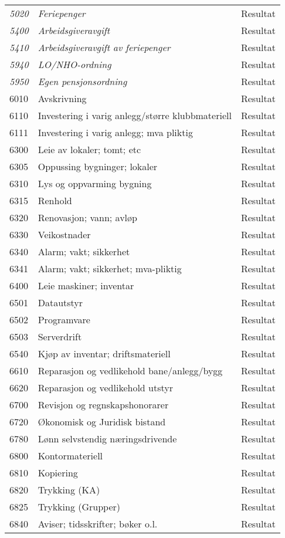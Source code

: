 \begin{longtable}{l l l}
\emph{5020} & \emph{Feriepenger} & Resultat\\
\emph{5400} & \emph{Arbeidsgiveravgift} & Resultat\\
\emph{5410} & \emph{Arbeidsgiveravgift av feriepenger} & Resultat\\
\emph{5940} & \emph{LO/NHO-ordning} & Resultat\\
\emph{5950} & \emph{Egen pensjonsordning} & Resultat\\
6010 & Avskrivning & Resultat\\
6110 & Investering i varig anlegg/større klubbmateriell & Resultat\\
6111 & Investering i varig anlegg; mva pliktig & Resultat\\
6300 & Leie av lokaler; tomt; etc & Resultat\\
6305 & Oppussing bygninger; lokaler & Resultat\\
6310 & Lys og oppvarming bygning & Resultat\\
6315 & Renhold & Resultat\\
6320 & Renovasjon; vann; avløp & Resultat\\
6330 & Veikostnader & Resultat\\
6340 & Alarm; vakt; sikkerhet & Resultat\\
6341 & Alarm; vakt; sikkerhet; mva-pliktig & Resultat\\
6400 & Leie maskiner; inventar & Resultat\\
6501 & Datautstyr & Resultat\\
6502 & Programvare & Resultat\\
6503 & Serverdrift & Resultat\\
6540 & Kjøp av inventar; driftsmateriell & Resultat\\
6610 & Reparasjon og vedlikehold bane/anlegg/bygg & Resultat\\
6620 & Reparasjon og vedlikehold utstyr & Resultat\\
6700 & Revisjon og regnskapshonorarer & Resultat\\
6720 & Økonomisk og Juridisk bistand & Resultat\\
6780 & Lønn selvstendig næringsdrivende & Resultat\\
6800 & Kontormateriell & Resultat\\
6810 & Kopiering & Resultat\\
6820 & Trykking (KA) & Resultat\\
6825 & Trykking (Grupper) & Resultat\\
6840 & Aviser; tidsskrifter; bøker o.l. & Resultat\\

\end{longtable}
